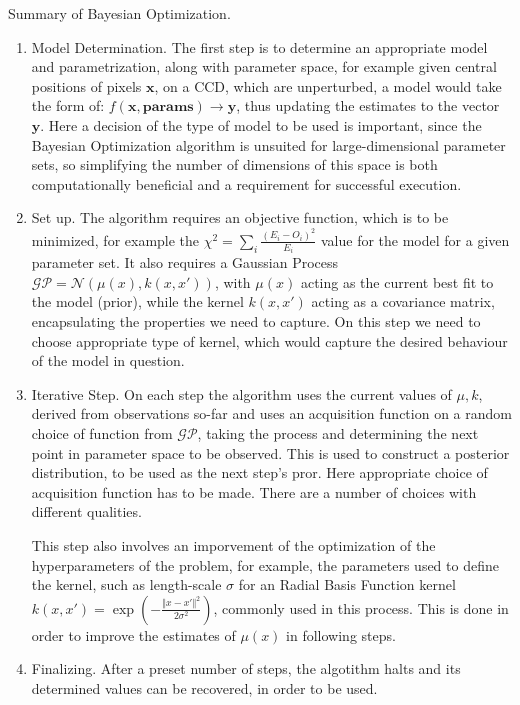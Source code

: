 \documentclass[12pt]{article}
\newenvironment{aside}
  {\begin{mdframed}[style=0,%
      leftline=false,rightline=false,leftmargin=2em,rightmargin=2em,%
          innerleftmargin=0pt,innerrightmargin=0pt,linewidth=0.75pt,%
      skipabove=7pt,skipbelow=7pt]\small}
  {\end{mdframed}}
\begin{document}
        \begin{aside}
        Summary of Bayesian Optimization. \cite{bo}

        \begin{enumerate}
            \item Model Determination. The first step is to determine an appropriate model and 
            parametrization, along with parameter space, for example given central positions of
            pixels $\mathbf{x}$, on a CCD, which are unperturbed, a model would take the form of: 
            $f(\mathbf{x}, \mathbf{params}) \rightarrow \mathbf{y}$, thus updating the estimates to 
            the vector $\mathbf{y}$. Here a decision of the type of model to be used is important, since
            the Bayesian Optimization algorithm is unsuited for large-dimensional parameter sets,
            so simplifying the number of dimensions of this space is both computationally beneficial and
            a requirement for successful execution.

            \item Set up. The algorithm requires an objective function, which is to be minimized,
            for example the $\chi^2 = \sum_i{\frac{(E_i - O_i)^2}{E_i}}$ value for the model for a given parameter set.
            It also requires a Gaussian Process $\mathscr{GP} = \mathscr{N}(\mu(x), k(x, x'))$, with $\mu(x)$ acting as 
            the current best fit to the model (prior), while the kernel $k(x, x')$ acting as a covariance matrix,
            encapsulating the properties we need to capture. On this step we need to choose appropriate type of kernel, 
            which would capture the desired behaviour of the model in question.

            \item Iterative Step. On each step the algorithm uses the current values of $\mu, k$, derived from
            observations so-far and uses an acquisition function on a random choice of function from $\mathscr{GP}$, taking the process and determining the 
            next point in parameter space to be observed. This is used to construct a posterior distribution, to 
            be used as the next step's pror. Here appropriate choice of acquisition function
            has to be made. There are a number of choices with different qualities. %

            This step also involves an imporvement of the optimization of the hyperparameters of the problem, 
            for example, the parameters used to define the kernel, such as length-scale $\sigma$ for an Radial Basis Function
            kernel $k(x, x') = \exp{\left(-\frac{\Vert x-x' \Vert^2}{2\sigma^2}\right)}$, commonly used in this process. This is done in order to improve the estimates of $\mu(x)$ in
            following steps.

            \item Finalizing. After a preset number of steps, the algotithm halts and its determined 
            values can be recovered, in order to be used.

        \end{enumerate}
        \end{aside}
\end{document}
